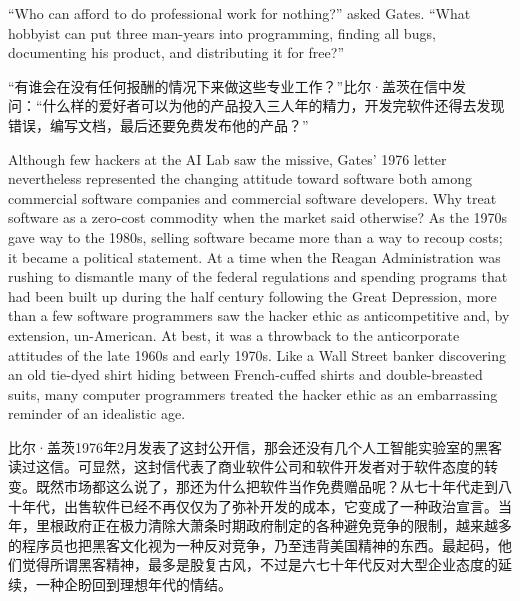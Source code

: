 \ifdefined\eng
``Who can afford to do professional work for nothing?'' asked Gates. ``What hobbyist can put three man-years into programming, finding all bugs, documenting his product, and distributing it for free?''
\fi

\ifdefined\chs
“有谁会在没有任何报酬的情况下来做这些专业工作？”比尔·盖茨在信中发问：“什么样的爱好者可以为他的产品投入三人年的精力，开发完软件还得去发现错误，编写文档，最后还要免费发布他的产品？”
\fi

\ifdefined\eng
Although few hackers at the AI Lab saw the missive, Gates' 1976 letter nevertheless represented the changing attitude toward software both among commercial software companies and commercial software developers. Why treat software as a zero-cost commodity when the market said otherwise? As the 1970s gave way to the 1980s, selling software became more than a way to recoup costs; it became a political statement. At a time when the Reagan Administration was rushing to dismantle many of the federal regulations and spending programs that had been built up during the half century following the Great Depression, more than a few software programmers saw the hacker ethic as anticompetitive and, by extension, un-American. At best, it was a throwback to the anticorporate attitudes of the late 1960s and early 1970s. Like a Wall Street banker discovering an old tie-dyed shirt hiding between French-cuffed shirts and double-breasted suits, many computer programmers treated the hacker ethic as an embarrassing reminder of an idealistic age.
\fi

\ifdefined\chs
比尔·盖茨1976年2月发表了这封公开信，那会还没有几个人工智能实验室的黑客读过这信。可显然，这封信代表了商业软件公司和软件开发者对于软件态度的转变。既然市场都这么说了，那还为什么把软件当作免费赠品呢？从七十年代走到八十年代，出售软件已经不再仅仅为了弥补开发的成本，它变成了一种政治宣言。当年，里根政府正在极力清除大萧条时期政府制定的各种避免竞争的限制，越来越多的程序员也把黑客文化视为一种反对竞争，乃至违背美国精神的东西。最起码，他们觉得所谓黑客精神，最多是股复古风，不过是六七十年代反对大型企业态度的延续，一种企盼回到理想年代的情结。
\fi

